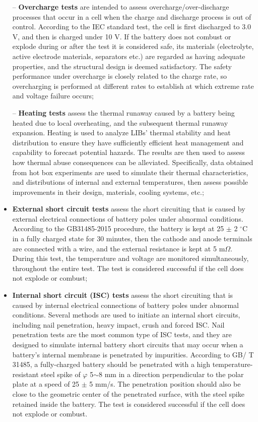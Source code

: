 \begin{itemize}
    \item[--] \textbf{Overcharge tests} are intended to assess overcharge/over-discharge processes that occur in a cell when the charge and discharge process is out of control. According to the IEC standard test, the cell is first discharged to 3.0 V, and then is charged under 10 V. If the battery does not combust or explode during or after the test it is considered safe, its materials (electrolyte, active electrode materials, separators etc.) are regarded as having adequate properties, and the structural design is deemed satisfactory. The safety performance under overcharge is closely related to the charge rate, so overcharging is performed at different rates to establish at which extreme rate and voltage failure occurs;
    \item[--] \textbf{Heating tests} assess the thermal runaway caused by a battery being heated due to local overheating, and the subsequent thermal runaway expansion. Heating is used to analyze LIBs' thermal stability and heat distribution to ensure they have sufficiently efficient heat management and capability to forecast potential hazards. The results are then used to assess how thermal abuse consequences can be alleviated. Specifically, data obtained from hot box experiments are used to simulate their thermal characteristics, and distributions of internal and external temperatures, then assess possible improvements in their design, materials, cooling systems, etc.;
    \item \textbf{External short circuit tests} assess the short circuiting that is caused by external electrical connections of battery poles under abnormal conditions. According to the GB31485-2015 procedure, the battery is kept at 25 $\pm$ 2 $^\circ$C in a fully charged state for 30 minutes, then the cathode and anode terminals are connected with a wire, and the external resistance is kept at 5 m$\Omega$. During this test, the temperature and voltage are monitored simultaneously, throughout the entire test. The test is considered successful if the cell does not explode or combust;
    \item \textbf{Internal short circuit (ISC) tests} assess the short circuiting that is caused by internal electrical connections of battery poles under abnormal conditions. Several methods are used to initiate an internal short circuits, including nail penetration, heavy impact, crush and forced ISC. Nail penetration tests are the most common type of ISC tests, and they are designed to simulate internal battery short circuits that may occur when a battery's internal membrane is penetrated by impurities. According to GB/ T 31485, a fully-charged battery should be penetrated with a high temperature-resistant steel spike of $\varphi$ 5$\sim$8 mm in a direction perpendicular to the polar plate at a speed of 25 $\pm$ 5 mm/s. The penetration position should also be close to the geometric center of the penetrated surface, with the steel spike retained inside the battery. The test is considered successful if the cell does not explode or combust.
\end{itemize}

